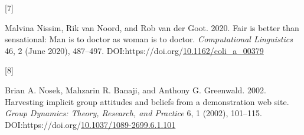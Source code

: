 \documentclass[
  10pt,
  dvipsnames,enabledeprecatedfontcommands, twocolumn]{scrartcl}
\newlength{\cslhangindent}
\newlength{\csllabelwidth}
\newlength{\cslentryspacingunit} %
\newenvironment{CSLReferences}[2] %
 {%
  \setlength{\parindent}{0pt}
  \ifodd #1
  \let\oldpar\par
  \def\par{\hangindent=\cslhangindent\oldpar}
  \fi
  \setlength{\parskip}{#2\cslentryspacingunit}
 }%
 {}
\newcommand{\CSLLeftMargin}[1]{\parbox[t]{\csllabelwidth}{#1}}
\newcommand{\CSLRightInline}[1]{\parbox[t]{\linewidth - \csllabelwidth}{#1}\break}
\begin{document}
\begin{CSLReferences}{0}{0}
\leavevmode{}%
\CSLLeftMargin{{[}7{]} }
\CSLRightInline{Malvina Nissim, Rik van Noord, and Rob van der Goot.
2020. Fair is better than sensational: Man is to doctor as woman is to
doctor. \emph{Computational Linguistics} 46, 2 (June 2020), 487--497.
DOI:https://doi.org/\href{https://doi.org/10.1162/coli_a_00379}{10.1162/coli\_a\_00379}}

\leavevmode{}%
\CSLLeftMargin{{[}8{]} }
\CSLRightInline{Brian A. Nosek, Mahzarin R. Banaji, and Anthony G.
Greenwald. 2002. Harvesting implicit group attitudes and beliefs from a
demonstration web site. \emph{Group Dynamics: Theory, Research, and
Practice} 6, 1 (2002), 101--115.
DOI:https://doi.org/\href{https://doi.org/10.1037/1089-2699.6.1.101}{10.1037/1089-2699.6.1.101}}

\end{CSLReferences}
\end{document}

